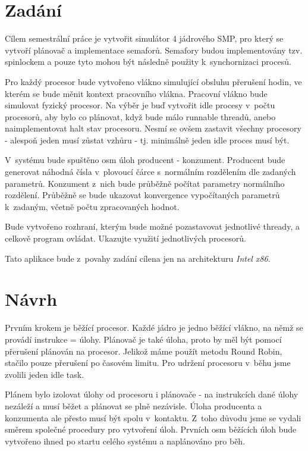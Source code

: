 \documentclass[a4paper,12pt]{article}
\begin{document}
\section{Zadání}

Cílem semestrální práce je vytvořit simulátor 4 jádrového SMP, pro který se vytvoří plánovač a implementace semaforů.
Semafory budou implementovány tzv. spinlockem a pouze tyto mohou být následně použity k~synchornizaci procesů.

Pro každý procesor bude vytvořeno vlákno simulující obsluhu přerušení hodin, ve kterém se bude měnit kontext pracovního vlákna. Pracovní vlákno bude simulovat fyzický procesor. Na výběr je buď vytvořit idle procesy v~počtu procesorů, aby bylo co plánovat, když bude málo runnable threadů, anebo naimplementovat halt stav procesoru. Nesmí se ovšem zastavit všechny procesory - alespoň jeden musí zůstat vzhůru - tj. minimálně jeden idle proces musí být.

V~systému bude spuštěno osm úloh producent - konzument. Producent bude generovat náhodná čísla v~plovoucí čárce s~normálním rozdělením dle zadaných parametrů. Konzument z~nich bude průběžně počítat parametry normálního rozdělení.
Průběžně se bude ukazovat konvergence vypočítaných parametrů k~zadaným, včetně počtu zpracovaných hodnot.

Bude vytvořeno rozhraní, kterým bude možné pozastavovat jednotlivé thready, a celkově program ovládat. Ukazujte využití jednotlivých procesorů.

Tato aplikace bude z~povahy zadání cílena jen na architekturu \emph{Intel x86}.

\section{Návrh}
Prvním krokem je běžící procesor. Každé jádro je jedno běžící vlákno, na němž se provádí instrukce = úlohy. Plánovač je také úloha, proto by měl být pomocí přerušení plánován na procesor. Jelikož máme použít metodu Round Robin, stačilo pouze přerušení po časovém limitu. Pro udržení procesoru v~běhu jsme zvolili jeden idle task.

Plánem bylo izolovat úlohy od procesoru i plánovače - na instrukcích dané úlohy nezáleží a musí běžet a plánovat se plně nezávisle. Úloha producenta a konzumenta ale přesto musí být spolu v~kontaktu. 
Z~toho důvodu jsme se vydali směrem společné procedury pro vytvoření úloh. Prvních osm běžících úloh bude vytvořeno ihned po startu celého systému a naplánováno pro běh.
\end{document}
